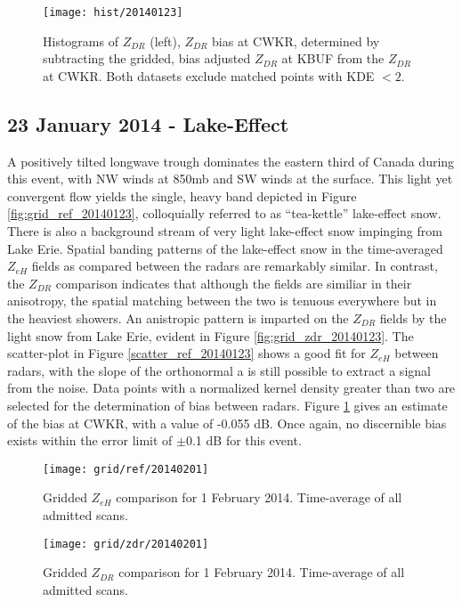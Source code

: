 \begin{figure}[p]
\texttt{[image: hist/20140123]}\centering
\caption{Histograms of $Z_{DR}$ (left), $Z_{DR}$ bias at CWKR, determined by subtracting the gridded, bias adjusted $Z_{DR}$ at KBUF from the $Z_{DR}$ at CWKR. Both datasets exclude matched points with KDE $< 2$. } 
\label{fig:hist_20140123}
\end{figure}

\subsection{23 January 2014 - Lake-Effect}

A positively tilted longwave trough dominates the eastern third of Canada during this event, with NW winds at 850mb and SW winds at the surface. This light yet convergent flow yields the single, heavy band depicted in Figure \ref{fig:grid_ref_20140123}, colloquially referred to as ``tea-kettle'' lake-effect snow. There is also a background stream of very light lake-effect snow impinging from Lake Erie. Spatial banding patterns of the lake-effect snow in the time-averaged $Z_{eH}$ fields as compared between the radars are remarkably similar. In contrast, the $Z_{DR}$ comparison indicates that although the fields are similiar in their anisotropy, the spatial matching between the two is tenuous everywhere but in the heaviest showers.  An anistropic pattern is imparted on the $Z_{DR}$ fields by the light snow from Lake Erie, evident in Figure \ref{fig:grid_zdr_20140123}. The scatter-plot in Figure \ref{scatter_ref_20140123} shows a good fit for $Z_{eH}$ between radars, with the slope of the orthonormal  a is still possible to extract a signal from the noise. Data points with a normalized kernel density greater than two are selected for the determination of bias between radars. Figure \ref{fig:hist_20140123} gives an estimate of the bias at CWKR, with a value of -0.055 dB. Once again, no discernible bias exists within the error limit of $\pm$0.1 dB for this event.



\begin{figure}[p]
\texttt{[image: grid/ref/20140201]}
\caption{Gridded $Z_{eH}$ comparison for 1 February 2014. Time-average of all admitted scans.} 
\label{fig:grid_ref_20140201}
\end{figure}

\begin{figure}[p]
\texttt{[image: grid/zdr/20140201]}
\caption{Gridded $Z_{DR}$ comparison for 1 February 2014. Time-average of all admitted scans.} 
\label{fig:grid_zdr_20140201}
\end{figure}

